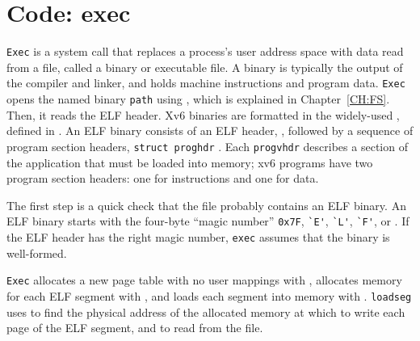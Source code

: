 \section{Code: exec}
\lstinline{Exec} is a system call that replaces a process's
user address space with data read from a file, called a binary
or executable file.
A binary is typically the output of the compiler and linker,
and holds machine instructions and program data.
\lstinline{Exec}  opens the
named binary \lstinline{path} using 
, which is explained in
Chapter~\ref{CH:FS}.  Then, it reads the ELF header. Xv6 binaries
are formatted in the widely-used , defined in
.  An ELF binary consists of an ELF header,
 ,
followed by a sequence of program section headers,
\lstinline{struct proghdr} .  Each
\lstinline{progvhdr} describes a section of the application that must
be loaded into memory; xv6 programs have two program section
headers: one for instructions and one for data.

The first step is a quick check that the file probably contains an
ELF binary.
An ELF binary starts with the four-byte ``magic number''
\lstinline{0x7F},
\lstinline{`E'},
\lstinline{`L'},
\lstinline{`F'},
or
.
If the ELF header has the right magic number,
\lstinline{exec}
assumes that the binary is well-formed.

\lstinline{Exec}
allocates a new page table with no user mappings with
,
allocates memory for each ELF segment with
,
and loads each segment into memory with
.
\lstinline{loadseg}
uses
to find the physical address of the allocated memory at which to write
each page of the ELF segment, and
to read from the file.


